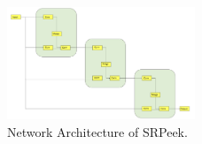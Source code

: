 \begin{figure}
 \centering
    \includegraphics[width=0.5\textwidth]{./pic/design.pdf}
    \caption{Network Architecture of SRPeek.}
    \label{fig-system}
\end{figure}
